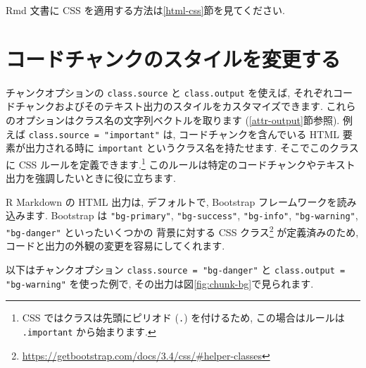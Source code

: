 \documentclass[
  11pt,
  lualatex,ja=standard,jafont=noto]{bxjsreport}
\renewcommand{\href}[2]{#2\footnote{\url{#1}}}
\begin{document}
Rmd 文書に CSS を適用する方法は\ref{html-css}節を見てください.

\hypertarget{chunk-styling}{%
\section{コードチャンクのスタイルを変更する}\label{chunk-styling}}

チャンクオプションの \texttt{class.source} と \texttt{class.output} を使えば, それぞれコードチャンクおよびそのテキスト出力のスタイルをカスタマイズできます. これらのオプションはクラス名の文字列ベクトルを取ります (\ref{attr-output}節参照). 例えば \texttt{class.source = "important"} は, コードチャンクを含んでいる HTML 要素が出力される時に \texttt{important} というクラス名を持たせます. そこでこのクラスに CSS ルールを定義できます.\footnote{CSS ではクラスは先頭にピリオド (\texttt{.}) を付けるため, この場合はルールは \texttt{.important} から始まります.} このルールは特定のコードチャンクやテキスト出力を強調したいときに役に立ちます.

R Markdown の HTML 出力は, デフォルトで, Bootstrap フレームワークを読み込みます. Bootstrap は \texttt{"bg-primary"}, \texttt{"bg-success"}, \texttt{"bg-info"}, \texttt{"bg-warning"}, \texttt{"bg-danger"} といったいくつかの \href{https://getbootstrap.com/docs/3.4/css/\#helper-classes}{背景に対する CSS クラス} が定義済みのため, コードと出力の外観の変更を容易にしてくれます.

以下はチャンクオプション \texttt{class.source = "bg-danger"} と \texttt{class.output = "bg-warning"} を使った例で, その出力は図\ref{fig:chunk-bg}で見られます.
\end{document}

